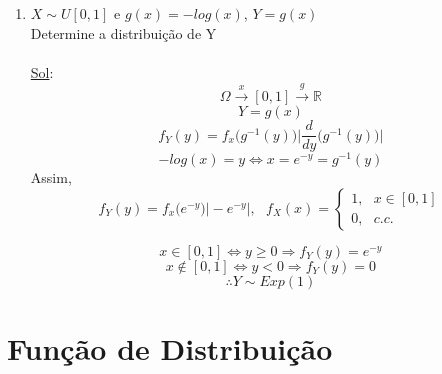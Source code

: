 \documentclass[a4paper,12pt]{article}
\begin{document}
\begin{enumerate}[label=\arabic*)]
        \item $X\sim U[0,1]$ e $g(x)=-log(x)$, $Y=g(x)$\\
        Determine a distribuição de Y\\
        \\
        \underline{Sol}:
        $$\Omega \overset{x}{\longrightarrow} [0,1] \overset{g}{\longrightarrow} \mathbb R   $$
        $$Y=g(x) $$
       $$f_Y(y)= f_x\bigg(g^{-1}(y)\bigg)\bigg|\frac{d}{dy}\bigg(g^{-1}(y)\bigg) \bigg|$$
       $$-log(x)=y \Leftrightarrow x=e^{-y}=g^{-1}(y) $$
       Assim,
       $$f_Y(y)= f_x\bigg( e^{-y}\bigg)\bigg| -e^{-y} \bigg|, \ \ \ f_X(x)= \begin{cases}
       1, \ \ \ x\in[0,1]\\
       0, \ \ \ c.c.
       \end{cases}$$
       
       $$x\in [0,1]\Leftrightarrow y\ge 0 \Rightarrow f_Y(y)= e^{-y} $$
              $$x\notin [0,1]\Leftrightarrow y< 0 \Rightarrow f_Y(y)= 0 $$
              $$\therefore Y\sim Exp(1)$$
       
\end{enumerate}
\newpage
\section*{Função de Distribuição }
\end{document}
